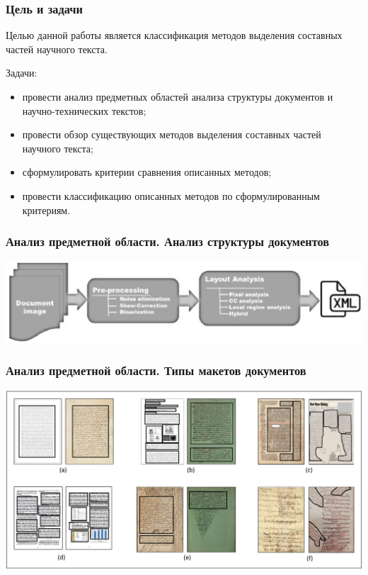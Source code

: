 \documentclass[gray]{beamer}
\begin{document}
\begin{frame}
    \frametitle{Цель и задачи}
    Целью данной работы является классификация методов выделения составных частей научного текста.

    \vfill

    Задачи:
    \begin{itemize}
        \item провести анализ предметных областей анализа структуры документов и научно-технических текстов;
        \item провести обзор существующих методов выделения составных частей научного текста;
        \item сформулировать критерии сравнения описанных методов;
        \item провести классификацию описанных методов по сформулированным критериям.
    \end{itemize}
\end{frame}

\begin{frame}
    \frametitle{Анализ предметной области. Анализ структуры документов}
    \centering
    \includegraphics[width=\textwidth]{img/typical-dla-system.png}
\end{frame}

\begin{frame}
    \frametitle{Анализ предметной области. Типы макетов документов}
    \centering
    \includegraphics[width=\textwidth]{img/layouts.png}
\end{frame}
\end{document}
